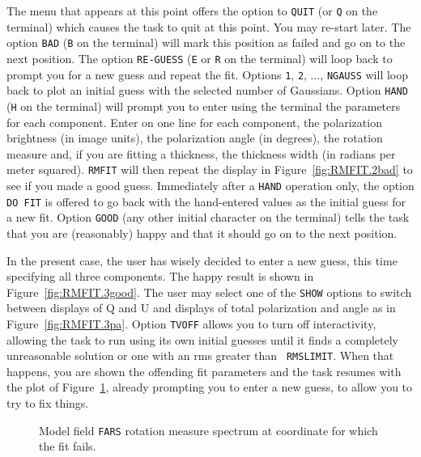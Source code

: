\documentclass[twoside]{article}
\newcommand{\Hi}[1]{\textcolor{hicol}{#1}}
\newcommand{\putfig}[1]{\texttt{[image: \#1.eps]}}
\begin{document}
The menu that appears at this point offers the option to {\tt QUIT}
(or {\tt Q} on the terminal) which causes the task to quit at this
point.  You may re-start later.  The option {\tt BAD} ({\tt B} on the
terminal) will mark this position as failed and go on to the next
position.   The option {\tt RE-GUESS} ({\tt E} or {\tt R} on the
terminal) will loop back to prompt you for a new guess and repeat the
fit.  Options {\tt 1}, {\tt 2}, $\ldots$, {\tt NGAUSS} will loop back
to plot an initial guess with the selected number of Gaussians.
Option {\tt HAND} ({\tt H} on the terminal) will prompt you to enter
using the terminal the parameters for each component.  Enter on one
line for each component, the polarization brightness (in image units),
the polarization angle (in degrees), the rotation measure and, if you
are fitting a thickness, the thickness width (in radians per meter
squared).  {\tt RMFIT} will then repeat the display in
Figure~\ref{fig:RMFIT.2bad} to see if you made a good guess.
Immediately after a {\tt HAND} operation only, the option {\tt DO FIT}
is offered to go back with the hand-entered values as the initial
guess for a new fit.  Option {\tt GOOD} (any other initial character
on the terminal) tells the task that you are (reasonably) happy and
that it should go on to the next position.

In the present case, the user has wisely decided to enter a new guess,
this time specifying all three components.  The happy result is shown
in Figure~\ref{fig:RMFIT.3good}.  \Hi{The user may select one of the
{\tt SHOW} options to switch between displays of Q and U and displays
of total polarization and angle as in Figure~\ref{fig:RMFIT.3pa}.}
Option {\tt TVOFF} allows you to turn off interactivity, allowing the
task to run using its own initial guesses until it finds a completely
unreasonable solution or one with an rms greater than {\tt
  RMSLIMIT}\@.  When that happens, you are shown the offending fit
parameters and the task resumes with the plot of
Figure~\ref{fig:RMFIT.tvrestart}, already prompting you to enter a
new guess, to allow you to try to fix things.

\begin{figure}
\begin{center}
\resizebox{5.0in}{!}{\putfig{RMFIT.tvrestart}}
\caption{Model field {\tt FARS} rotation measure spectrum at
  coordinate for which the fit fails.}
\label{fig:RMFIT.tvrestart}
\end{center}
\end{figure}
\end{document}

